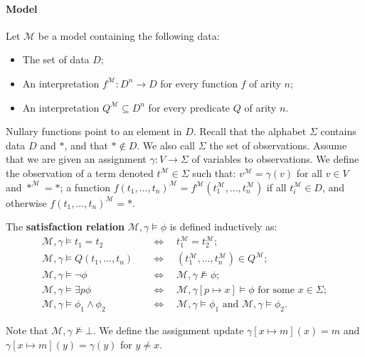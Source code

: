 \paragraph{Model} Let $\mathcal{M}$ be a model containing the following data:
\begin{itemize}
	\item The set of data $D$;
	\item An interpretation $f^\mathcal{M} : D^n\rightarrow D$ for every function $f$ of arity $n$;
	\item An interpretation $Q^\mathcal{M}\subseteq D^n$ for every predicate $Q$ of arity $n$.
\end{itemize}
Nullary functions point to an element in $D$.
Recall that the alphabet $\Sigma$ contains data $D$ and $*$, and that $*\not\in D$.
We also call $\Sigma$ the set of observations.
Assume that we are given an assignment $\gamma:V\rightarrow\Sigma$ of variables to observations.
We define the observation of a term denoted $t^\mathcal{M}\in\Sigma$ such that:
$v^\mathcal{M}=\gamma(v)$ for all $v\in V$ and $*^\mathcal{M}=*$;
a function $f(t_1,...,t_n)^\mathcal{M}=f^\mathcal{M}(t_1^\mathcal{M},...,t_n^\mathcal{M})$ if
all $t_i^\mathcal{M}\in D$, and otherwise $f(t_1,...,t_n)^\mathcal{M}=*$.

\begin{definition}
	The \textbf{satisfaction relation} $\mathcal{M}, \gamma \models \phi$ is defined inductively as:
\begin{align*}
	\mathcal{M}, \gamma \models t_1=t_2 \quad &\Leftrightarrow \quad t_1^\mathcal{M}=t_2^\mathcal{M}; \\
	\mathcal{M}, \gamma \models Q(t_1,...,t_n) \quad &\Leftrightarrow \quad (t_1^\mathcal{M},...,t_n^\mathcal{M}) \in Q^\mathcal{M}; \\
	\mathcal{M}, \gamma \models \neg\phi \quad &\Leftrightarrow \quad \mathcal{M}, \gamma \not\models \phi ; \\
	\mathcal{M}, \gamma \models \exists p\phi \quad &\Leftrightarrow \quad \mathcal{M}, \gamma[p \mapsto x ] \models \phi \text{ for some }x \in \Sigma ; \\
	\mathcal{M}, \gamma \models \phi_1\land\phi_2 \quad &\Leftrightarrow \quad \mathcal{M}, \gamma \models \phi_1\text{ and }\mathcal{M}, \gamma \models \phi_2.
\end{align*}	
\end{definition}
Note that $\mathcal{M}, \gamma \not\models \bot$.
We define the assignment update $\gamma[x \mapsto m](x) = m$ and $\gamma[x \mapsto m](y) = \gamma(y)$ for $y\neq x$.

